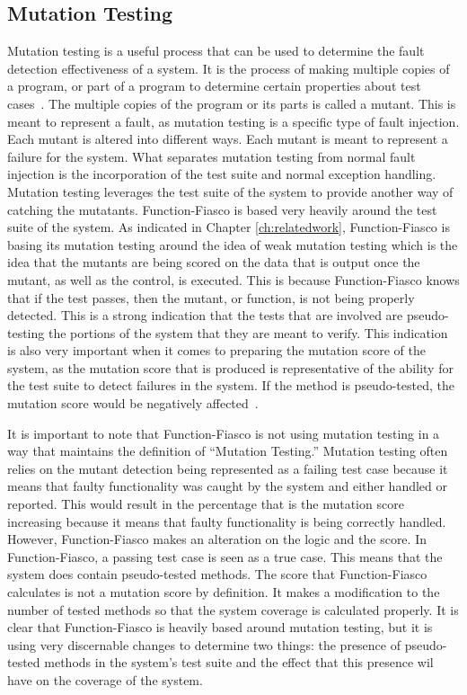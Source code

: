   \subsection{Mutation Testing}
  Mutation testing is a useful process that can be used to determine the fault detection effectiveness of a system. It is the process of making multiple copies of a program, or part of a program to determine certain properties about test cases~\cite{friedman_voas_1995}. The multiple copies of the program or its parts is called a mutant. This is meant to represent a fault, as mutation testing is a specific type of fault injection. Each mutant is altered into different ways. Each mutant is meant to represent a failure for the system. What separates mutation testing from normal fault injection is the incorporation of the test suite and normal exception handling. Mutation testing leverages the test suite of the system to provide another way of catching the mutatants. Function-Fiasco is based very heavily around the test suite of the system. As indicated in Chapter \ref{ch:relatedwork}, Function-Fiasco is basing its mutation testing around the idea of weak mutation testing which is the idea that the mutants are being scored on the data that is output once the mutant, as well as the control, is executed. This is because Function-Fiasco knows that if the test passes, then the mutant, or function, is not being properly detected. This is a strong indication that the tests that are involved are pseudo-testing the portions of the system that they are meant to verify. This indication is also very important when it comes to preparing the mutation score of the system, as the mutation score that is produced is representative of the ability for the test suite to detect failures in the system. If the method is pseudo-tested, the mutation score would be negatively affected~\cite{friedman_voas_1995}.

  It is important to note that Function-Fiasco is not using mutation testing in a way that maintains the definition of ``Mutation Testing.'' Mutation testing often relies on the mutant detection being represented as a failing test case because it means that faulty functionality was caught by the system and either handled or reported. This would result in the percentage that is the mutation score increasing because it means that faulty functionality is being correctly handled. However, Function-Fiasco makes an alteration on the logic and the score. In Function-Fiasco, a passing test case is seen as a true case. This means that the system does contain pseudo-tested methods. The score that Function-Fiasco calculates is not a mutation score by definition. It makes a modification to the number of tested methods so that the system coverage is calculated properly. It is clear that Function-Fiasco is heavily based around mutation testing, but it is using very discernable changes to determine two things: the presence of pseudo-tested methods in the system's test suite and the effect that this presence wil have on the coverage of the system.

